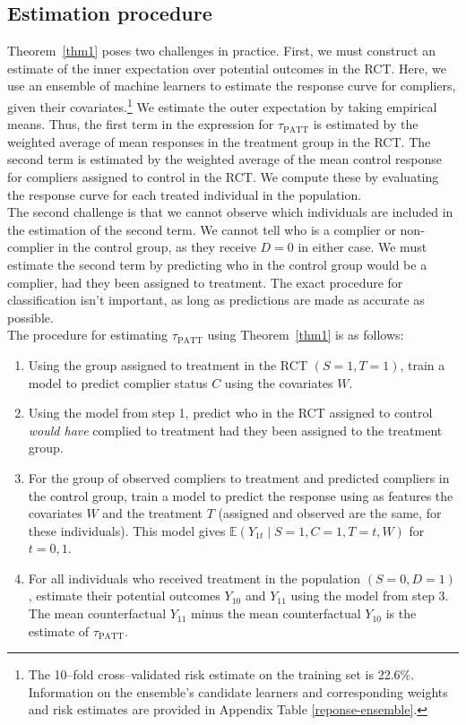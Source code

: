 \documentclass[12pt]{article}
\newcommand{\ex}{\mathbb{E}} %
\begin{document}
\subsection{Estimation procedure}
Theorem~\ref{thm1} poses two challenges in practice.  First, we must construct an estimate of the inner expectation over potential outcomes in the RCT.  Here, we use an ensemble of machine learners \citep{van2007} to estimate the response curve for compliers, given their covariates.\footnote{The 10--fold cross--validated risk estimate on the training set is 22.6\%. Information on the ensemble's candidate learners and corresponding weights and risk estimates are provided in Appendix Table \ref{reponse-ensemble}.}  We estimate the outer expectation by taking empirical means.  Thus, the first term in the expression for $\tau_{\text{PATT}}$ is estimated by the weighted average of mean responses in the treatment group in the RCT. The second term is estimated by the weighted average of the mean control response for compliers assigned to control in the RCT.  We compute these by evaluating the response curve for each treated individual in the population.  \\

The second challenge is that we cannot observe which individuals are included in the estimation of the second term. We cannot tell who is a complier or non-complier in the control group, as they receive $D=0$ in either case.  We must estimate the second term by predicting who in the control group would be a complier, had they been assigned to treatment.  The exact procedure for classification isn't important, as long as predictions are made as accurate as possible. \\

The procedure for estimating $\tau_{\text{PATT}}$ using Theorem~\ref{thm1} is as follows:
\begin{enumerate}
\item Using the group assigned to treatment in the RCT $(S=1, T=1)$, train a model to predict complier status $C$ using the covariates $W$.
\item Using the model from step 1, predict who in the RCT assigned to control \textit{would have} complied to treatment had they been assigned to the treatment group.
\item For the group of observed compliers to treatment and predicted compliers in the control group, train a model to predict the response using as features the covariates $W$ and the treatment $T$ (assigned and observed are the same, for these individuals).  This model gives $\ex(Y_{1t} \mid S=1, C=1, T=t, W)$ for $t = 0,1$.
\item For all individuals who received treatment in the population $(S=0, D=1)$, estimate their potential outcomes $Y_{10}$ and $Y_{11}$ using the model from step 3.  The mean counterfactual $Y_{11}$ minus the mean counterfactual $Y_{10}$ is the estimate of $\tau_{\text{PATT}}$.
\end{enumerate}
\end{document}
